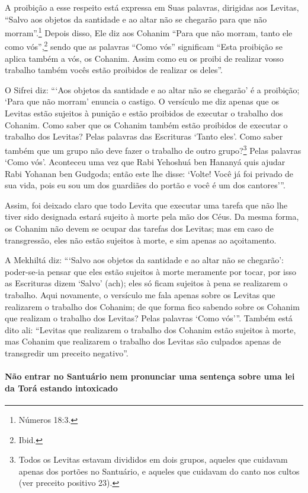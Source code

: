 A proibição a esse respeito está expressa em Suas palavras, dirigidas
aos Levitas, ``Salvo aos objetos da santidade e ao altar não se chegarão
para que não morram''.\footnote{Números 18:3.} Depois disso, Ele diz aos
Cohanim ``Para que não morram, tanto ele como vós'',\footnote{Ibid.} sendo
que as palavras ``Como vós'' significam ``Esta proibição se aplica
também a vós, os Cohanim. Assim como eu os proibi de realizar vosso
trabalho também vocês estão proibidos de realizar os deles''.

O Sifrei diz: ```Aos objetos da santidade e ao altar não se chegarão' é
a proibição; `Para que não morram' enuncia o castigo. O versículo me diz
apenas que os Levitas estão sujeitos à punição e estão proibidos de
executar o trabalho dos Cohanim. Como saber que os Cohanim também
estão proibidos de executar o trabalho dos Levitas? Pelas palavras das
Escrituras `Tanto eles'. Como saber também que um grupo não deve fazer o
trabalho de outro grupo?\footnote{Todos os Levitas estavam divididos em dois grupos, aqueles que cuidavam apenas dos portões no Santuário, e aqueles que cuidavam do
canto nos cultos (ver preceito positivo 23).} Pelas palavras `Como
vós'. Aconteceu uma vez que Rabi Yehoshuá ben Hananyá quis ajudar Rabi
Yohanan ben Gudgoda; então este lhe disse: `Volte! Você já foi privado
de sua vida, pois eu sou um dos guardiães do portão e você é um dos
cantores'''.

Assim, foi deixado claro que todo Levita que executar uma tarefa que não
lhe tiver sido designada estará sujeito à morte pela mão dos Céus. Da
mesma forma, os Cohanim não devem se ocupar das tarefas dos Levitas;
mas em caso de transgressão, eles não estão sujeitos à morte, e sim
apenas ao açoitamento.

A Mekhiltá diz: ```Salvo aos objetos da santidade e ao altar não se
chegarão': poder-se-ia pensar que eles estão sujeitos à morte meramente
por tocar, por isso as Escrituras dizem `Salvo' (ach); eles só ficam
sujeitos à pena se realizarem o trabalho. Aqui novamente, o versículo me
fala apenas sobre os Levitas que realizarem o trabalho dos Cohanim; de
que forma fico sabendo sobre os Cohanim que realizam o trabalho dos Levitas? Pelas palavras `Como
vós'''. Também está dito ali: ``Levitas que realizarem o trabalho dos
Cohanim estão sujeitos à morte, mas Cohanim que realizarem o
trabalho dos Levitas são culpados apenas de transgredir um preceito
negativo''.

\paragraph{Não entrar no Santuário nem pronunciar uma
sentença sobre uma lei da Torá estando intoxicado}

